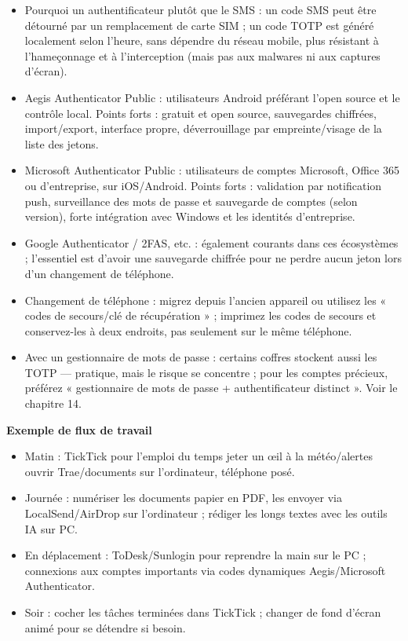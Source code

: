 \begin{itemize}
  \item Pourquoi un authentificateur plutôt que le SMS : un code SMS peut être détourné par un remplacement de carte SIM ; un code TOTP est généré localement selon l'heure, sans dépendre du réseau mobile, plus résistant à l'hameçonnage et à l'interception (mais pas aux malwares ni aux captures d'écran).
  \item Aegis Authenticator Public : utilisateurs Android préférant l'open source et le contrôle local. Points forts : gratuit et open source, sauvegardes chiffrées, import/export, interface propre, déverrouillage par empreinte/visage de la liste des jetons.
  \item Microsoft Authenticator Public : utilisateurs de comptes Microsoft, Office 365 ou d'entreprise, sur iOS/Android. Points forts : validation par notification push, surveillance des mots de passe et sauvegarde de comptes (selon version), forte intégration avec Windows et les identités d'entreprise.
  \item Google Authenticator / 2FAS, etc. : également courants dans ces écosystèmes ; l'essentiel est d'avoir une sauvegarde chiffrée pour ne perdre aucun jeton lors d'un changement de téléphone.
  \item Changement de téléphone : migrez depuis l'ancien appareil ou utilisez les « codes de secours/clé de récupération » ; imprimez les codes de secours et conservez-les à deux endroits, pas seulement sur le même téléphone.
  \item Avec un gestionnaire de mots de passe : certains coffres stockent aussi les TOTP — pratique, mais le risque se concentre ; pour les comptes précieux, préférez « gestionnaire de mots de passe + authentificateur distinct ». Voir le chapitre 14.
\end{itemize}


\textbf{Exemple de flux de travail}\par

\begin{itemize}
  \item Matin : TickTick pour l'emploi du temps jeter un œil à la météo/alertes ouvrir Trae/documents sur l'ordinateur, téléphone posé.
  \item Journée : numériser les documents papier en PDF, les envoyer via LocalSend/AirDrop sur l'ordinateur ; rédiger les longs textes avec les outils IA sur PC.
  \item En déplacement : ToDesk/Sunlogin pour reprendre la main sur le PC ; connexions aux comptes importants via codes dynamiques Aegis/Microsoft Authenticator.
  \item Soir : cocher les tâches terminées dans TickTick ; changer de fond d'écran animé pour se détendre si besoin.
\end{itemize}


